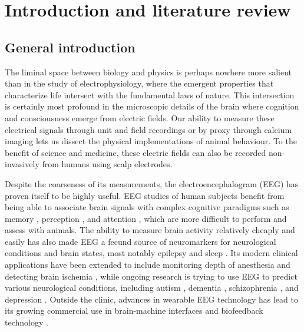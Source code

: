\chapter{Introduction and literature review} \label{sec:intro}


\section{General introduction}

The liminal space between biology and physics is perhaps nowhere more salient than in the study of electrophysiology, where the emergent properties that characterize life intersect with the fundamental laws of nature. This intersection is certainly most profound in the microscopic details of the brain where cognition and consciousness emerge from electric fields. Our ability to measure these electrical signals through unit and field recordings or by proxy through calcium imaging lets us dissect the physical implementations of animal behaviour. To the benefit of science and medicine, these electric fields can also be recorded non-invasively from humans using scalp electrodes.

Despite the coarseness of its measurements, the electroencephalogram (EEG) has proven itself to be highly useful. EEG studies of human subjects benefit from being able to associate brain signals with complex cognitive paradigms such as memory \cite{Osipova2006, Sauseng2009, Sauseng2010}, perception \cite{Rodriguez1999, Melloni2007,Fahrenfort2012}, and attention \cite{Hillyard1998, Makeig2002}, which are more difficult to perform and assess with animals. The ability to measure brain activity relatively cheaply and easily has also made EEG a fecund source of neuromarkers for neurological conditions and brain states, most notably epilepsy \cite{Engel1984,Noachtar2009} and sleep \cite{Wolpert1969, Prerau2016}. Its modern clinical applications have been extended to include monitoring depth of anesthesia \cite{Michael2008} and detecting brain ischemia \cite{Meghdadi2021}, while ongoing research is trying to use EEG to predict various neurological conditions, including autism \cite{Bosl2018}, dementia \cite{Meghdadi2021}, schizophrenia \cite{Meghdadi2021}, and depression \cite{DeAguiarNeto2019}. Outside the clinic, advances in wearable EEG technology has lead to its growing commercial use in brain-machine interfaces \cite{Mahmood2021} and biofeedback technology \cite{Hunkin2021}. 

